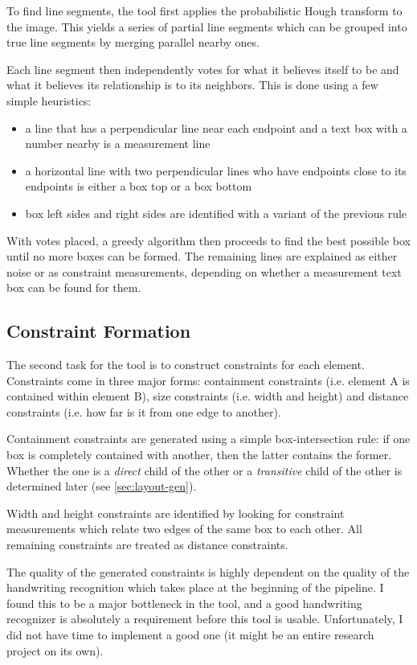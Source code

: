 \documentclass{article}
\begin{document}
To find line segments, the tool first applies the probabilistic Hough transform
\cite{HoughTransform2000} to the image. This yields a series of partial line
segments which can be grouped into true line segments by merging parallel nearby
ones.

Each line segment then independently votes for what it believes itself to be and what it believes its relationship is to its neighbors. This is done using a few simple heuristics:
\begin{itemize}
\item a line that has a perpendicular line near each endpoint and a text box
    with a number nearby is a measurement line
\item a horizontal line with two perpendicular lines who have endpoints close to
    its endpoints is either a box top or a box bottom
\item box left sides and right sides are identified with a variant of the
    previous rule
\end{itemize}

With votes placed, a greedy algorithm then proceeds to find the best possible
box until no more boxes can be formed. The remaining lines are explained as
either noise or as constraint measurements, depending on whether a measurement
text box can be found for them.

\subsection{Constraint Formation}
\label{sec:constraint-formation}

The second task for the tool is to construct constraints for each element.
Constraints come in three major forms: containment constraints (i.e. element A
is contained within element B), size constraints (i.e. width and height) and
distance constraints (i.e. how far is it from one edge to another).

Containment constraints are generated using a simple box-intersection rule: if
one box is completely contained with another, then the latter contains the
former. Whether the one is a \emph{direct} child of the other or a
\emph{transitive} child of the other is determined later (see
\autoref{sec:layout-gen}).

Width and height constraints are identified by looking for constraint
measurements which relate two edges of the same box to each other. All remaining
constraints are treated as distance constraints.

The quality of the generated constraints is highly dependent on the quality of
the handwriting recognition which takes place at the beginning of the pipeline.
I found this to be a major bottleneck in the tool, and a good handwriting
recognizer is absolutely a requirement before this tool is usable.
Unfortunately, I did not have time to implement a good one (it might be an
entire research project on its own).
\end{document}

